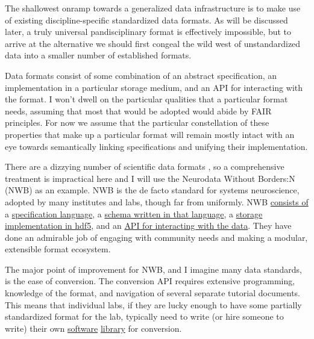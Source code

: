 \documentclass[10pt]{article}
\begin{document}
\begin{multicols}{2}
 The shallowest onramp towards a generalized data
infrastructure is to make use of existing discipline-specific
standardized data formats. As will be discussed later, a truly universal
pandisciplinary format is effectively impossible, but to arrive at the
alternative we should first congeal the wild west of unstandardized data
into a smaller number of established formats.

Data formats consist of some combination of an abstract specification,
an implementation in a particular storage medium, and an API for
interacting with the format. I won't dwell on the particular qualities
that a particular format needs, assuming that most that would be adopted
would abide by FAIR principles. For now we assume that the particular
constellation of these properties that make up a particular format will
remain mostly intact with an eye towards semantically linking
specifications and unifying their implementation.

There are a dizzying number of scientific data formats \cite{teamScientificDataFormats} , so a comprehensive treatment is
impractical here and I will use the Neurodata Without Borders:N
(NWB)\cite{rubelNWBAccessibleData2019a}  as an example. NWB is
the de facto standard for systems neuroscience, adopted by many
institutes and labs, though far from uniformly. NWB
\href{https://www.nwb.org/nwb-software/}{consists of} a
\href{https://schema-language.readthedocs.io/en/stable/}{specification
language}, a \href{https://nwb-schema.readthedocs.io/en/stable/}{schema
written in that language}, a
\href{https://nwb-storage.readthedocs.io/en/stable/}{storage
implementation in hdf5}, and an
\href{https://pynwb.readthedocs.io/en/stable/}{API for interacting with
the data}. They have done an admirable job of engaging with community
needs \cite{rubelNeurodataBordersEcosystem2021}  and making a
modular, extensible format ecosystem.

The major point of improvement for NWB, and I imagine many data
standards, is the ease of conversion. The conversion API requires
extensive programming, knowledge of the format, and navigation of
several separate tutorial documents. This means that individual labs, if
they are lucky enough to have some partially standardized format for the
lab, typically need to write (or hire someone to write) their own
\href{https://github.com/catalystneuro/tank-lab-to-nwb}{software}
\href{https://github.com/catalystneuro/mease-lab-to-nwb}{library} for
conversion.


\end{multicols}
\end{document}

